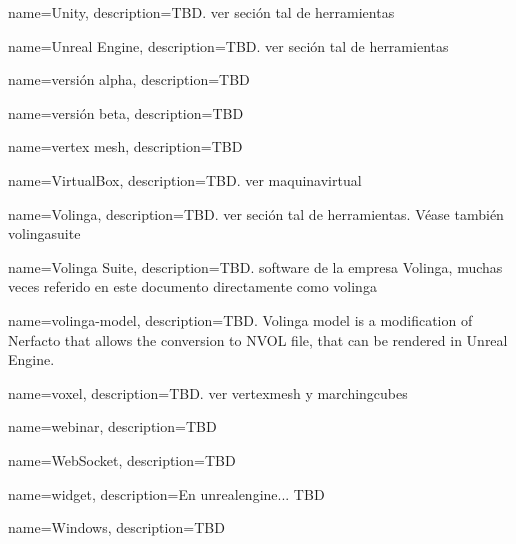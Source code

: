 {
    name={Unity},
    description={TBD. ver seción tal de herramientas}
}

{
    name={Unreal Engine},
    description={TBD. ver seción tal de herramientas}
}


{
    name={versión alpha},
    description={TBD}
}

{
    name={versión beta},
    description={TBD}
}

{
    name={vertex \gls{mesh}},
    description={TBD}
}

{
    name={VirtualBox},
    description={TBD. ver \gls{maquinavirtual}}
}

{
    name={Volinga},
    description={TBD. ver seción tal de herramientas. Véase también \gls{volingasuite}}
}

{
    name={Volinga Suite},
    description={TBD. software de la empresa Volinga, muchas veces referido en este documento directamente como \gls{volinga}}
}

{
    name={volinga-model},
    description={TBD. Volinga model is a modification of Nerfacto that allows the conversion to NVOL file, that can be rendered in Unreal Engine.}
}

{
    name={voxel},
    description={TBD. ver \gls{vertexmesh} y \gls{marchingcubes}}
}


{
    name={webinar},
    description={TBD}
}

{
    name={WebSocket},
    description={TBD}
}

{
    name={widget},
    description={En \gls{unrealengine}... TBD}
}

{
    name={Windows},
    description={TBD}
}




